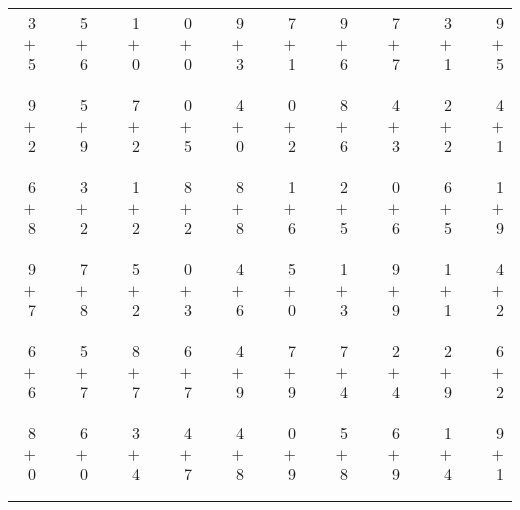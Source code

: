 \documentclass[12pt, letterpaper]{article}
\begin{document}
\begin{tabular}{rrrrrrrrrrrrrrrrrrr}
3 & & 5 & & 1 & & 0 & & 9 & & 7 & & 9 & & 7 & & 3 & & 9\\
$+$ 5 & & $+$ 6 & & $+$ 0 & & $+$ 0 & & $+$ 3 & & $+$ 1 & & $+$ 6 & & $+$ 7 & & $+$ 1 & & $+$ 5\\
\cline{1-1} \cline{3-3} \cline{5-5} \cline{7-7} \cline{9-9} \cline{11-11} \cline{13-13} \cline{15-15} \cline{17-17} \cline{19-19} \\ \\
9 & & 5 & & 7 & & 0 & & 4 & & 0 & & 8 & & 4 & & 2 & & 4\\
$+$ 2 & & $+$ 9 & & $+$ 2 & & $+$ 5 & & $+$ 0 & & $+$ 2 & & $+$ 6 & & $+$ 3 & & $+$ 2 & & $+$ 1\\
\cline{1-1} \cline{3-3} \cline{5-5} \cline{7-7} \cline{9-9} \cline{11-11} \cline{13-13} \cline{15-15} \cline{17-17} \cline{19-19} \\ \\
6 & & 3 & & 1 & & 8 & & 8 & & 1 & & 2 & & 0 & & 6 & & 1\\
$+$ 8 & & $+$ 2 & & $+$ 2 & & $+$ 2 & & $+$ 8 & & $+$ 6 & & $+$ 5 & & $+$ 6 & & $+$ 5 & & $+$ 9\\
\cline{1-1} \cline{3-3} \cline{5-5} \cline{7-7} \cline{9-9} \cline{11-11} \cline{13-13} \cline{15-15} \cline{17-17} \cline{19-19} \\ \\
9 & & 7 & & 5 & & 0 & & 4 & & 5 & & 1 & & 9 & & 1 & & 4\\
$+$ 7 & & $+$ 8 & & $+$ 2 & & $+$ 3 & & $+$ 6 & & $+$ 0 & & $+$ 3 & & $+$ 9 & & $+$ 1 & & $+$ 2\\
\cline{1-1} \cline{3-3} \cline{5-5} \cline{7-7} \cline{9-9} \cline{11-11} \cline{13-13} \cline{15-15} \cline{17-17} \cline{19-19} \\ \\
6 & & 5 & & 8 & & 6 & & 4 & & 7 & & 7 & & 2 & & 2 & & 6\\
$+$ 6 & & $+$ 7 & & $+$ 7 & & $+$ 7 & & $+$ 9 & & $+$ 9 & & $+$ 4 & & $+$ 4 & & $+$ 9 & & $+$ 2\\
\cline{1-1} \cline{3-3} \cline{5-5} \cline{7-7} \cline{9-9} \cline{11-11} \cline{13-13} \cline{15-15} \cline{17-17} \cline{19-19} \\ \\
8 & & 6 & & 3 & & 4 & & 4 & & 0 & & 5 & & 6 & & 1 & & 9\\
$+$ 0 & & $+$ 0 & & $+$ 4 & & $+$ 7 & & $+$ 8 & & $+$ 9 & & $+$ 8 & & $+$ 9 & & $+$ 4 & & $+$ 1\\
\cline{1-1} \cline{3-3} \cline{5-5} \cline{7-7} \cline{9-9} \cline{11-11} \cline{13-13} \cline{15-15} \cline{17-17} \cline{19-19} \\ \\

\end{tabular}
\end{document}
